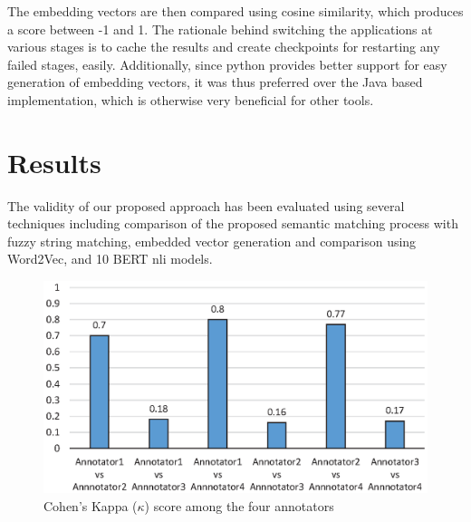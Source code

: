 \documentclass{ieeeaccess}
\begin{document}
The embedding vectors are then compared using cosine similarity, which produces a score between -1 and 1.
The rationale behind switching the applications at various stages is to cache the results and create checkpoints for restarting any failed stages, easily. Additionally, since python provides better support for easy generation of embedding vectors, it was thus preferred over the Java based implementation, which is otherwise very beneficial for other tools.

\section{Results}
\label{results}

The validity of our proposed approach has been evaluated using several techniques including comparison of the proposed semantic matching process with fuzzy string matching, embedded vector generation and comparison using Word2Vec, and 10 BERT nli models. 

\begin{figure}[htb!]
	\centering
	\includegraphics[width=\columnwidth]{kappaInterAnnotatorAgrement}
	\caption{Cohen's Kappa ($\kappa$) score among the four annotators}
	\label{fig:kappaInterAnnotatorAgrement}
\end{figure}
\end{document}
